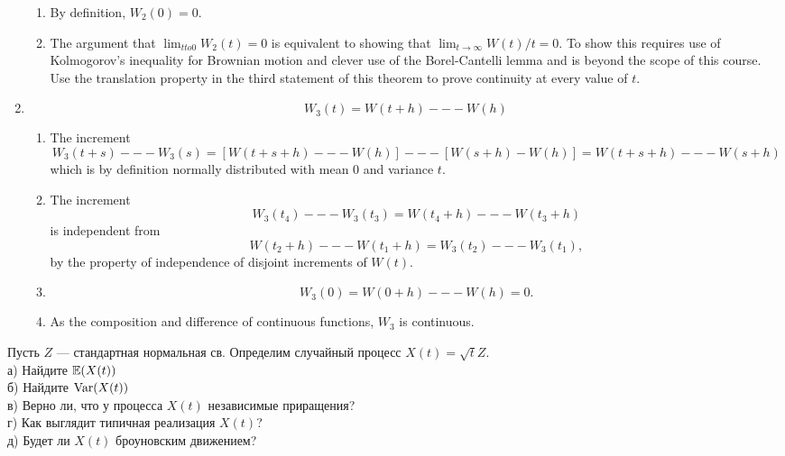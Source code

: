 \begin{solution}
\begin{solution}
\begin{solution}
\begin{solution}
\begin{solution}
\begin{solution}
\begin{solution}
\begin{solution}
\begin{solution}
\begin{solution}
\begin{enumerate}
\begin{enumerate}
    \item
    By definition, $ W_2(0) = 0 $.
    
    \item
    The argument that $ \lim_{t to 0} W_2(t) = 0 $ is
    equivalent to showing that $ \lim_{t \to \infty} W(t)/t
    = 0 $.  To show this requires use of Kolmogorov's
    inequality for Brownian motion and clever use of the
    Borel-Cantelli lemma and is beyond the scope of this
    course.  Use the translation property in the third
    statement of this theorem to prove continuity at every
    value of $ t $.
  \end{enumerate}

  \item
  \[
      W_3(t) = W(t+h) --- W(h)
  \]
  \begin{enumerate}
    \item
    The increment
    \[
        W_3(t+s) --- W_3(s) = [ W(t+s+h) --- W(h) ] --- [ W(s+h) -
        W(h) ] = W(t+s+h) --- W(s+h)
    \]
    which is by definition normally distributed with mean $
    0 $ and variance $ t $.

    \item
    The increment
    \[
        W_3(t_4) --- W_3(t_3) = W(t_4+h) --- W(t_3+h)
    \]
    is independent from
    \[
        W(t_2+h) --- W(t_1+h) = W_3(t_2) --- W_3(t_1),
    \]
    by the property of independence of disjoint increments
    of $ W(t) $.

    \item
    \[
        W_3(0) = W(0+h) --- W(h) = 0.
    \]

    \item
    As the composition and difference of continuous
    functions, $ W_3 $ is continuous.
    \end{enumerate}
  \end{enumerate}

\end{solution}

\begin{problem}
Пусть $Z$ --- стандартная нормальная св. Определим случайный процесс $X(t)=\sqrt{t}Z$. \\
а) Найдите $\mathbb{E}(X(t))$ \\
б) Найдите $\operatorname{Var}(X(t))$ \\
в) Верно ли, что у процесса $X(t)$ независимые приращения? \\
г) Как выглядит типичная реализация $X(t)$? \\
д) Будет ли $X(t)$ броуновским движением? 
\end{problem} 
\begin{solution} 
}


\end{solution}
\end{solution}
\end{solution}
\end{solution}
\end{solution}
\end{solution}
\end{solution}
\end{solution}
\end{solution}
\end{solution}
